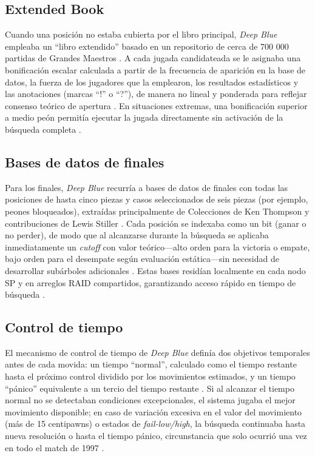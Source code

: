 \documentclass[a4paper, 12pt]{article}
\begin{document}
\subsection{Extended Book}

Cuando una posición no estaba cubierta por el libro principal, 
\textit{Deep Blue} empleaba un “libro extendido” basado en un 
repositorio de cerca de 700 000 partidas de Grandes Maestros 
\cite{campbell2002deep}. A cada jugada candidateada se le asignaba 
una bonificación escalar calculada a partir de la frecuencia de 
aparición en la base de datos, la fuerza de los jugadores que la 
emplearon, los resultados estadísticos y las anotaciones 
(marcas “!” o “?”), de manera no lineal y ponderada para 
reflejar consenso teórico de apertura \cite{campbell2002deep}. 
En situaciones extremas, una bonificación superior a medio 
peón permitía ejecutar la jugada directamente sin activación de 
la búsqueda completa \cite{campbell2002deep}.

\subsection{Bases de datos de finales}

Para los finales, \textit{Deep Blue} recurría a bases de datos 
de finales con todas las posiciones de hasta cinco piezas y 
casos seleccionados de seis piezas (por ejemplo, peones 
bloqueados), extraídas principalmente de Colecciones de Ken 
Thompson y contribuciones de Lewis Stiller \cite{campbell2002deep}. 
Cada posición se indexaba como un bit (ganar o no perder), de 
modo que al alcanzarse durante la búsqueda se aplicaba 
inmediatamente un \emph{cutoff} con valor teórico—alto orden 
para la victoria o empate, bajo orden para el desempate según 
evaluación estática—sin necesidad de desarrollar subárboles 
adicionales \cite{campbell2002deep}. Estas bases residían localmente 
en cada nodo SP y en arreglos RAID compartidos, garantizando 
acceso rápido en tiempo de búsqueda \cite{campbell2002deep}.

\subsection{Control de tiempo}

El mecanismo de control de tiempo de \textit{Deep Blue} definía 
dos objetivos temporales antes de cada movida: un tiempo 
“normal”, calculado como el tiempo restante hasta el próximo 
control dividido por los movimientos estimados, y un tiempo 
“pánico” equivalente a un tercio del tiempo restante 
\cite{campbell2002deep}. Si al alcanzar el tiempo normal no se 
detectaban condiciones excepcionales, el sistema jugaba el mejor 
movimiento disponible; en caso de variación excesiva en el valor 
del movimiento (más de 15 centipawns) o estados de 
\emph{fail-low/high}, la búsqueda continuaba hasta nueva 
resolución o hasta el tiempo pánico, circunstancia que solo 
ocurrió una vez en todo el match de 1997 \cite{campbell2002deep}.
\end{document}
